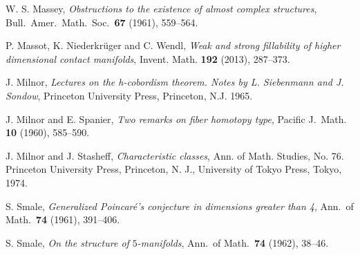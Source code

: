 \documentclass[12pt]{amsart}
\theoremstyle{remark}
\begin{document}
\begin{thebibliography}{999}

 W. S. Massey, {\em Obstructions to the existence of almost complex structures}, 
Bull.~Amer.~Math.~Soc.~{\bf 67} (1961), 559--564.

 P. Massot, K. Niederkr\"uger and C. Wendl,
{\em Weak and strong fillability of higher dimensional contact manifolds}, Invent. Math. {\bf192} (2013), 287--373.

 J. Milnor, 
{\em Lectures on the h-cobordism theorem. Notes by L. Siebenmann and J. Sondow},
Princeton University Press, Princeton, N.J. 1965.

 J. Milnor and E. Spanier, {\em Two remarks on fiber homotopy type}, Pacific J.~Math. {\bf 10} (1960), 585--590.

 J. Milnor and J. Stasheff, {\em Characteristic classes},  Ann. of Math. Studies, No. 76. Princeton University Press, Princeton, N. J., University of Tokyo Press, Tokyo, 1974.
  



 S. Smale, {\em Generalized Poincar\'{e}'s conjecture in dimensions greater than 4}, Ann.~of Math.~{\bf 74} (1961), 391--406.

 S. Smale, {\em On the structure of $5$-manifolds}, 
Ann.~of Math.~{\bf 74} (1962), 38--46.

  

\end{thebibliography}
\end{document}
